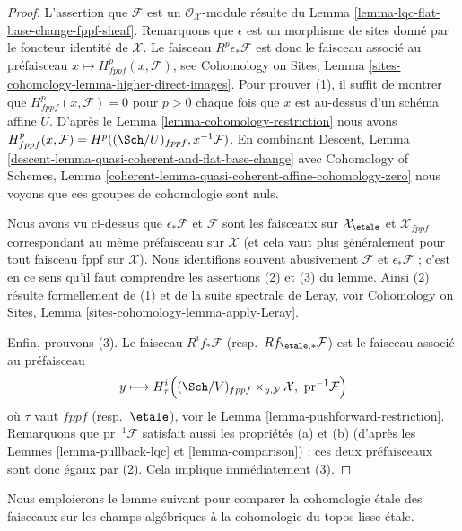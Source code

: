 \begin{proof}
L'assertion que $\mathcal{F}$ est un $\mathcal{O}_\mathcal{X}$-module
résulte du
Lemma \ref{lemma-lqc-flat-base-change-fppf-sheaf}.
Remarquons que $\epsilon$ est un morphisme de sites donné par le foncteur
identité de $\mathcal{X}$. Le faisceau $R^p\epsilon_*\mathcal{F}$ est donc
le faisceau associé au préfaisceau
$x \mapsto H^p_{fppf}(x, \mathcal{F})$, see
Cohomology on Sites, Lemma \ref{sites-cohomology-lemma-higher-direct-images}.
Pour prouver (1), il suffit de montrer que
$H^p_{fppf}(x, \mathcal{F}) = 0$ pour $p > 0$
chaque fois que $x$ est au-dessus d'un schéma affine $U$. D'après le
Lemma \ref{lemma-cohomology-restriction}
nous avons
$H^p_{fppf}(x, \mathcal{F}) = H^p((\Sch/U)_{fppf}, x^{-1}\mathcal{F})$.
En combinant
Descent, Lemma \ref{descent-lemma-quasi-coherent-and-flat-base-change}
avec Cohomology of Schemes, Lemma
\ref{coherent-lemma-quasi-coherent-affine-cohomology-zero}
nous voyons que ces groupes de cohomologie sont nuls.

\medskip\noindent
Nous avons vu ci-dessus que $\epsilon_*\mathcal{F}$ et $\mathcal{F}$ sont les
faisceaux sur $\mathcal{X}_\etale$ et $\mathcal{X}_{fppf}$
correspondant au même préfaisceau sur $\mathcal{X}$ (et cela vaut plus
généralement pour tout faisceau fppf sur $\mathcal{X}$).
Nous identifions souvent abusivement $\mathcal{F}$ et $\epsilon_*\mathcal{F}$ ;
c'est en ce sens qu'il faut comprendre les assertions (2) et (3) du
lemme. Ainsi (2) résulte formellement de (1) et de la suite spectrale de
Leray, voir
Cohomology on Sites, Lemma \ref{sites-cohomology-lemma-apply-Leray}.

\medskip\noindent
Enfin, prouvons (3). Le faisceau $R^if_*\mathcal{F}$
(resp.\ $Rf_{\etale, *}\mathcal{F}$)
est le faisceau associé au préfaisceau
$$
y \longmapsto
H^i_\tau\Big((\Sch/V)_{fppf} \times_{y, \mathcal{Y}} \mathcal{X},
\ \text{pr}^{-1}\mathcal{F}\Big)
$$
où $\tau$ vaut $fppf$ (resp.\ $\etale$), voir le
Lemma \ref{lemma-pushforward-restriction}.
Remarquons que $\text{pr}^{-1}\mathcal{F}$ satisfait aussi les propriétés (a) et (b)
(d'après les Lemmes \ref{lemma-pullback-lqc} et \ref{lemma-comparison}) ;
ces deux préfaisceaux sont donc égaux par (2).
Cela implique immédiatement (3).
\end{proof}

\noindent
Nous emploierons le lemme suivant pour comparer la cohomologie étale des faisceaux
sur les champs algébriques à la cohomologie du topos lisse-étale.

